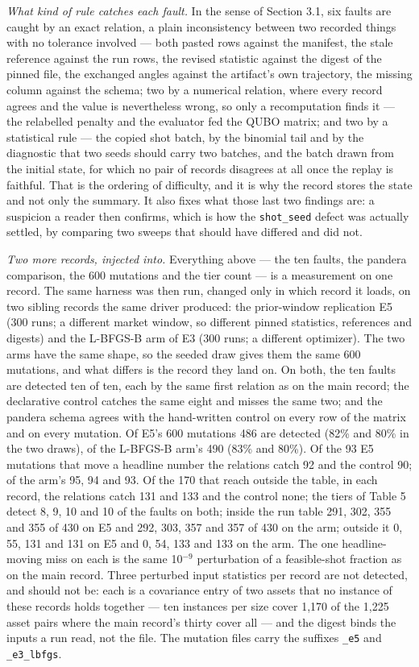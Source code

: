 \documentclass[acmsmall,screen,review]{acmart}
\begin{document}
\textit{What kind of rule catches each fault.} In the sense of Section 3.1, six faults are caught by an exact relation, a plain inconsistency between two recorded things with no tolerance involved --- both pasted rows against the manifest, the stale reference against the run rows, the revised statistic against the digest of the pinned file, the exchanged angles against the artifact's own trajectory, the missing column against the schema; two by a numerical relation, where every record agrees and the value is nevertheless wrong, so only a recomputation finds it --- the relabelled penalty and the evaluator fed the QUBO matrix; and two by a statistical rule --- the copied shot batch, by the binomial tail and by the diagnostic that two seeds should carry two batches, and the batch drawn from the initial state, for which no pair of records disagrees at all once the replay is faithful. That is the ordering of difficulty, and it is why the record stores the state and not only the summary. It also fixes what those last two findings are: a suspicion a reader then confirms, which is how the \texttt{shot\_seed} defect was actually settled, by comparing two sweeps that should have differed and did not.


\textit{Two more records, injected into.} Everything above --- the ten faults, the pandera comparison, the 600 mutations and the tier count --- is a measurement on one record. The same harness was then run, changed only in which record it loads, on two sibling records the same driver produced: the prior-window replication E5 (300 runs; a different market window, so different pinned statistics, references and digests) and the L-BFGS-B arm of E3 (300 runs; a different optimizer). The two arms have the same shape, so the seeded draw gives them the same 600 mutations, and what differs is the record they land on. On both, the ten faults are detected ten of ten, each by the same first relation as on the main record; the declarative control catches the same eight and misses the same two; and the pandera schema agrees with the hand-written control on every row of the matrix and on every mutation. Of E5's 600 mutations 486 are detected (82\% and 80\% in the two draws), of the L-BFGS-B arm's 490 (83\% and 80\%). Of the 93 E5 mutations that move a headline number the relations catch 92 and the control 90; of the arm's 95, 94 and 93. Of the 170 that reach outside the table, in each record, the relations catch 131 and 133 and the control none; the tiers of Table 5 detect 8, 9, 10 and 10 of the faults on both; inside the run table 291, 302, 355 and 355 of 430 on E5 and 292, 303, 357 and 357 of 430 on the arm; outside it 0, 55, 131 and 131 on E5 and 0, 54, 133 and 133 on the arm. The one headline-moving miss on each is the same 10$^{-9}$ perturbation of a feasible-shot fraction as on the main record. Three perturbed input statistics per record are not detected, and should not be: each is a covariance entry of two assets that no instance of these records holds together --- ten instances per size cover 1,170 of the 1,225 asset pairs where the main record's thirty cover all --- and the digest binds the inputs a run read, not the file. The mutation files carry the suffixes \texttt{\_e5} and \texttt{\_e3\_lbfgs}.
\end{document}
